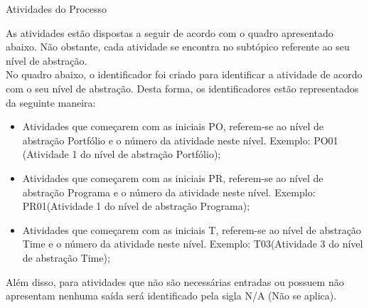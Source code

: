 \large{Atividades do Processo \\}

\tab As atividades  estão dispostas a seguir de acordo com o quadro apresentado abaixo. Não obstante, cada atividade se encontra no subtópico referente ao seu nível de abstração. \\
\tab No quadro abaixo, o identificador foi criado para identificar a atividade de acordo com o seu nível de abstração. Desta forma, os identificadores estão representados da seguinte maneira: 

\begin{itemize}
	\item Atividades que começarem com as iniciais PO, referem-se ao nível de abstração Portfólio e o número da atividade neste nível. Exemplo: PO01 (Atividade 1 do nível de abstração Portfólio);
	\item Atividades que começarem com as iniciais PR, referem-se ao nível de abstração Programa e o número da atividade neste nível. Exemplo: PR01(Atividade 1 do nível de abstração Programa);
	\item Atividades que começarem com as iniciais T, referem-se ao nível de abstração Time e o número da atividade neste nível. Exemplo: T03(Atividade 3 do nível de abstração Time); 
\end{itemize}

\tab Além disso, para atividades que não são necessárias entradas ou possuem não apresentam nenhuma saída será identificado pela sigla N/A (Não se aplica).\\


